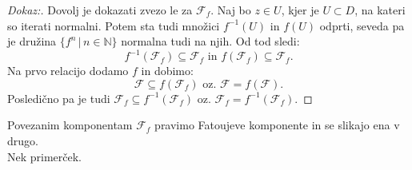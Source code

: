 \documentclass{article}
\newcommand{\N}{\mathbb{N}}
\newcommand{\F}{\mathcal{F}}
\begin{document}
\begin{proof}[Dokaz:]
Dovolj je dokazati zvezo le za $\F_f$. Naj bo $z\in U$, kjer je $U \subset D$, na kateri so iterati normalni. Potem sta tudi množici $f^{-1}(U)$ in $f(U)$ odprti, seveda pa je družina $\{f^n \,|\, n\in \N\}$ normalna tudi na njih. Od tod sledi:
$$
f^{-1}(\F_f) \subseteq \F_f \text{ in } f(\F_f) \subseteq \F_f.
$$
Na prvo relacijo dodamo $f$ in dobimo:
$$
\F \subseteq f(\F_f) \text{ oz. } \F = f(\F).
$$
Posledično pa je tudi $\F_f \subseteq f^{-1}(\F_f)$ oz. $\F_f = f^{-1}(\F_f)$.
\end{proof}

Povezanim komponentam $\F_f$ pravimo Fatoujeve komponente in se slikajo ena v drugo.\\ 
Nek primerček.
\end{document}
